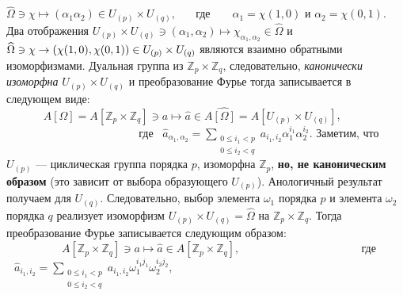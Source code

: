 \documentclass{../../template/mai_book}
\begin{document}
$\widehat{\Omega} \ni \chi \longmapsto (\alpha_1 \alpha_2) \in U_{(p)} \times U_{(q)}, \;\;\;\;\;$ где $\;\;\;\;\;\; \alpha_1 = \chi (1,0)$ и $\alpha_2 = \chi (0,1)$.
\newpage
\noindent
Два отображения $U_{(p)} \times U_{(q)} \ni (\alpha_1 , \alpha_2) \longmapsto \chi_{\alpha_1 , \alpha_2} \in \widehat{\Omega}$ и $\widehat{\Omega} \ni \chi \rightarrow (\chi (1,0) , \chi (0,1)) \in U_{(p)} \\ \times U_{(q)}$ являются взаимно обратными изоморфизмами. Дуальная группа из
$\mathds{Z}_p \times \mathds{Z}_q$, следовательно, {\itshape канонически изоморфна} $U_{(p)} \times U_{(q)}$ и преобразование Фурье тогда записывается в следующем виде: \newline \newline \indent
$\;\;\;\;\;\;\;\;\;\;\;\; A[\Omega] = A[\mathds{Z}_p \times \mathds{Z}_q] \ni a \longmapsto \hat a \in A \widehat{[\Omega]} = A[U_{(p)} \times U_{(q)}]$, \newline \newline \indent
$\;\;\;\;\;\;\;\;\;\;\;\;\;\;\;\;\;\;\;\;\;\;\;\;\;\;\;\;\;\;\;\;\;\;\;\;\;\;\;\;\;\:$ где $\;\: \hat a_{\alpha_1 , \alpha_2} = \sum \limits_{\substack{0 \le i_1 < p \\ 0 \le i_2 < q}}a_{i_1 , i_2} \alpha_1^{i_1} \alpha_2^{i_2}.$ \newline \newline \newline 
Заметим, что $U_{(p)}$ --- циклическая группа порядка $p$, изоморфна $\mathds{Z}_p$, \textbf{но, не каноническим образом} (это зависит от выбора образующего $U_{(p)}$). Анологичный результат получаем для $U_{(q)}$. Следовательно, выбор элемента $\omega_1$ порядка $p$ и элемента $\omega_2$ порядка $q$ реализует изоморфизм $U_{(p)} \times U_{(q)} = \widehat{\Omega}$ на $\mathds{Z}_p \times \mathds{Z}_q$. Тогда преобразование Фурье записывается следующим образом: \newline \newline \indent
$\;\;\;\;\;\;\;\;\;\;\;\;\;\;\;\;\;\;A[\mathds{Z}_p \times \mathds{Z}_q] \ni a \longmapsto \hat a \in A[\mathds{Z}_p \times \mathds{Z}_q],$ \newline \newline \indent
$\;\;\;\;\;\;\;\;\;\;\;\;\;\;\;\;\;\;\;\;\;\;\;\;\;\;\;\;\;\;\;\;\;\;\;\;\;$ где $\:\;\: \hat a_{i_1 , i_2} = \sum \limits_{\substack{0 \le i_1 < p \\ 0 \le i_2 < q}}a_{i_1 , i_2} \omega_1^{i_1 j_1} \omega_2^{i_2 j_2},$ \newline \newline \newline
\end{document}
